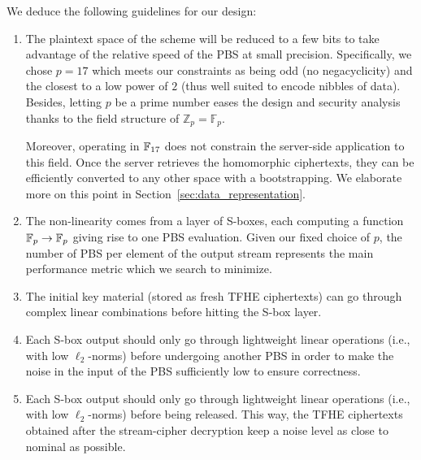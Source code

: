 We deduce the following guidelines for our design:
\begin{enumerate}
\item The plaintext space of the scheme will be reduced to a few bits to take advantage of the relative speed of the PBS at small precision. Specifically, we chose $p=17$ which meets our constraints as being odd (no negacyclicity) and the closest to a low power of $2$ (thus well suited to encode nibbles of data). Besides, letting $p$ be a prime number eases the design and security analysis thanks to the field structure of $\mathbb{Z}_p = \mathbb{F}_p$.
  
Moreover, operating in $\mathbb{F}_{17}$ does not constrain the server-side application to this field. Once the server retrieves the homomorphic ciphertexts, they can be efficiently converted to any other space with a bootstrapping. We elaborate more on this point in Section~\ref{sec:data_representation}. 


  \item The non-linearity comes from a layer of S-boxes, each computing a function $\mathbb{F}_{p} \to \mathbb{F}_{p}$  giving rise to one PBS evaluation. Given our fixed choice of $p$, the number of PBS per element of the output stream represents the main performance metric which we search to minimize. 

  
  \item The initial key material (stored as fresh TFHE ciphertexts) can go through complex linear combinations
  before hitting the S-box layer.
  
  \item Each S-box output should only go through lightweight linear operations (i.e., with low $\ell_2$-norms) before undergoing another PBS in order to make the noise in the input of the PBS sufficiently low to ensure correctness.

  
  \item Each S-box output should only go through lightweight linear operations (i.e., with low $\ell_2$-norms) before being
  released. This way, the TFHE ciphertexts obtained after the stream-cipher decryption keep a noise level as close to nominal as possible.
\end{enumerate}